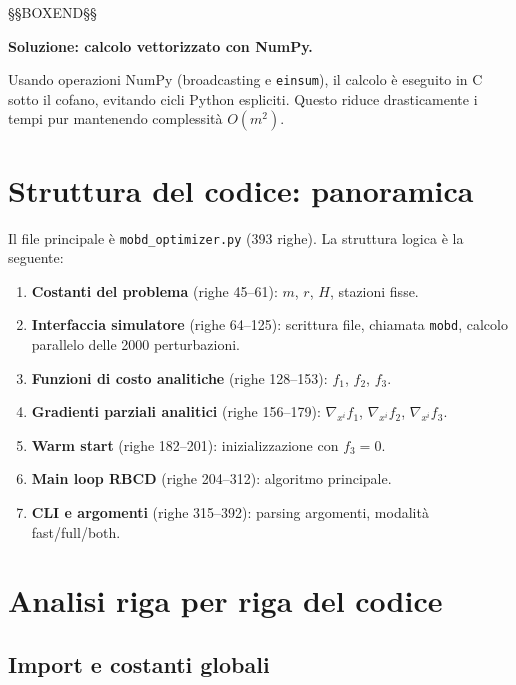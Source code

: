 \documentclass[12pt,a4paper]{article}
\theoremstyle{definition}
\newcommand{\grad}{\nabla}
\begin{document}
\noindent §§BOXEND§§



\textbf{Soluzione: calcolo vettorizzato con NumPy.}

Usando operazioni NumPy (broadcasting e \texttt{einsum}), il calcolo è eseguito in C sotto
il cofano, evitando cicli Python espliciti. Questo riduce drasticamente i tempi pur mantenendo
complessità $O(m^2)$.

\section{Struttura del codice: panoramica}

Il file principale è \texttt{mobd\_optimizer.py} (393 righe).
La struttura logica è la seguente:

\begin{enumerate}
  \item \textbf{Costanti del problema} (righe 45–61): $m$, $r$, $H$, stazioni fisse.
  \item \textbf{Interfaccia simulatore} (righe 64–125): scrittura file, chiamata \texttt{mobd},
        calcolo parallelo delle 2000 perturbazioni.
  \item \textbf{Funzioni di costo analitiche} (righe 128–153): $f_1$, $f_2$, $f_3$.
  \item \textbf{Gradienti parziali analitici} (righe 156–179): $\grad_{x^i} f_1$,
        $\grad_{x^i} f_2$, $\grad_{x^i} f_3$.
  \item \textbf{Warm start} (righe 182–201): inizializzazione con $f_3 = 0$.
  \item \textbf{Main loop RBCD} (righe 204–312): algoritmo principale.
  \item \textbf{CLI e argomenti} (righe 315–392): parsing argomenti, modalità fast/full/both.
\end{enumerate}

\section{Analisi riga per riga del codice}

\subsection{Import e costanti globali}
\end{document}
